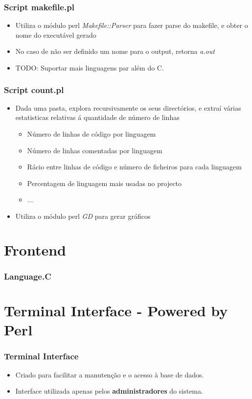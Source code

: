 \documentclass{beamer}
\begin{document}
\begin{frame} \frametitle{Script makefile.pl}
\begin{itemize} 
\item Utiliza o módulo perl \textit{Makefile::Parser} para fazer parse do makefile, e obter o nome do executável gerado
\item No caso de não ser definido um nome para o output, retorna \textit{a.out}
\item TODO: Suportar mais linguagens par além do C.
\end{itemize}
\end{frame}

\begin{frame} \frametitle{Script count.pl}
\begin{itemize} 
\item Dada uma pasta, explora recursivamente os seus directórios, e extraí várias estatisticas relativas á quantidade de número de linhas
  \begin{itemize}
    \item Número de linhas de código por linguagem
    \item Número de linhas comentadas por linguagem
	\item Rácio entre linhas de código e número de ficheiros para cada linguagem
	\item Percentagem de linguagem mais usadas no projecto
	\item ...
  \end{itemize}
\item Utiliza o módulo perl \textit{GD} para gerar gráficos
\end{itemize}
\end{frame}

\section{Frontend}
\begin{frame} \frametitle{Language.C}
\end{frame}

\section{Terminal Interface - Powered by Perl}
\begin{frame} \frametitle{Terminal Interface}
\begin{itemize}
 \item Criado para facilitar a manutenção e o acesso à base de dados.
 \item Interface utilizada apenas pelos \textbf{administradores} do sistema.
\end{itemize}
\end{frame}
\end{document}
